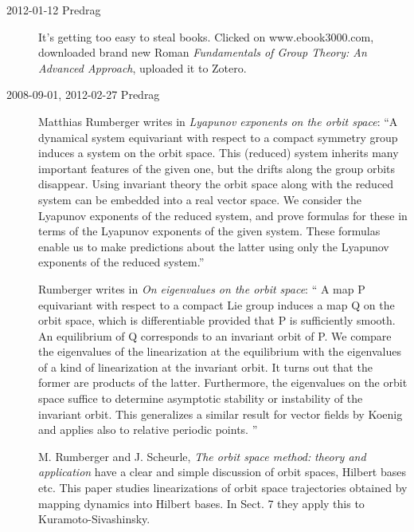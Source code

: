 \begin{description}
\item[2012-01-12 Predrag] It's getting too easy to steal books. Clicked
on
{www.ebook3000.com}, downloaded brand new Roman {\em
Fundamentals of Group Theory: An Advanced Approach}, uploaded it to
Zotero.

\item[2008-09-01, 2012-02-27 Predrag]
{Matthias Rumberger} writes in
{\emph{Lyapunov exponents on the orbit space}}:
``A dynamical system equivariant with respect to a compact symmetry
group induces a system on the orbit space. This (reduced) system
inherits many important features of the given one, but the drifts along the
group orbits disappear. Using invariant theory the orbit space along with the
reduced system can be embedded into a real vector space. We consider the
Lyapunov exponents of the reduced system, and prove formulas for these in
terms of the Lyapunov exponents of the given system. These formulas enable
us to make predictions about the latter using only the Lyapunov exponents of
the reduced system.''

Rumberger writes in
\emph{On eigenvalues on the orbit space}: ``
A map P equivariant with respect to a compact Lie group induces a map Q
on the orbit space, which is differentiable provided that P is
sufficiently smooth. An equilibrium of Q corresponds to an invariant
orbit of P. We compare the eigenvalues of the linearization at the
equilibrium with the eigenvalues of a kind of linearization at the
invariant orbit. It turns out that the former are products of the latter.
Furthermore, the eigenvalues on the orbit space suffice to determine
asymptotic stability or instability of the invariant orbit. This
generalizes a similar result for vector fields by Koenig
and applies also to relative periodic points.
''

M. Rumberger and J. Scheurle,
{\emph{The orbit space method:}}
\emph{theory and application}
have a clear and simple discussion of orbit spaces,
Hilbert bases etc. This paper studies linearizations of orbit space
trajectories obtained by mapping dynamics into Hilbert bases.
In Sect. 7 they apply this to Kuramoto-Sivashinsky.


\end{description}

